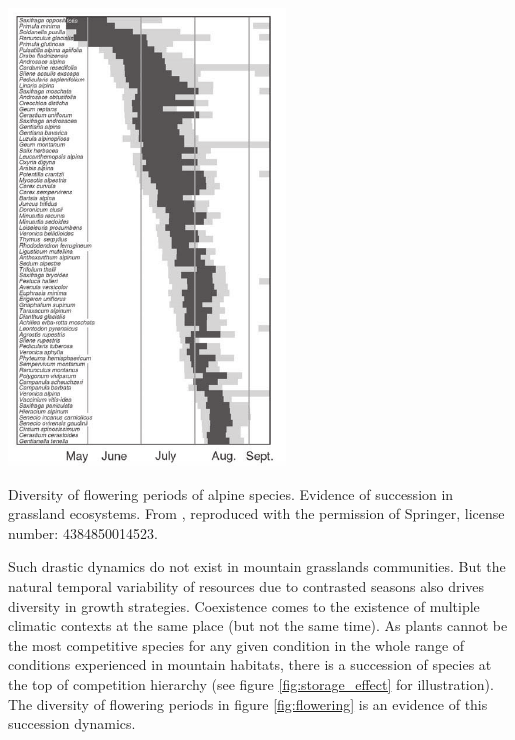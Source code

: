 \begin{marginfigure}
    \includegraphics{./1_Introduction/graphics/flowering_m.pdf}
  \caption[Flowering periods of alpine species]{Diversity of flowering periods of alpine species. Evidence of succession in grassland ecosystems. From \cite{korner_alpine_2003}, reproduced with the permission of Springer, license number: 4384850014523.}
  \label{fig:flowering}
\end{marginfigure}

Such drastic dynamics do not exist in mountain grasslands communities. But the natural temporal variability of resources due to contrasted seasons also drives diversity in growth strategies. Coexistence comes to the existence of multiple climatic contexts at the same place (but not the same time). As plants cannot be the most competitive species for any given condition in the whole range of conditions experienced in mountain habitats, there is a succession of species at the top of competition hierarchy \parencite{adler_climate_2006} (see figure \ref{fig:storage_effect} for illustration). The diversity of flowering periods in figure \ref{fig:flowering} is an evidence of this succession dynamics.

